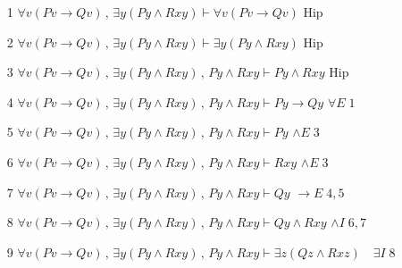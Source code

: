 \documentclass[11pt,letterpaper]{article}
\begin{document}
\begin{enumerate}
\item[1] $ \forall v (Pv \rightarrow Qv) \, , \, \exists y (P y \wedge Rxy) 
\vdash \forall v (Pv \rightarrow Qv) $ \hspace{2cm} Hip
\vspace*{5pt}
\item[2] $ \forall v (Pv \rightarrow Qv) \, , \, \exists y (P y \wedge Rxy) 
\vdash \exists y (P y \wedge Rxy) $ \hspace{2cm} Hip
\vspace*{5pt}
\item[3] $ \forall v (Pv \rightarrow Qv) \, , \, \exists y (P y \wedge Rxy) \, 
, 
\, P y \wedge Rxy \vdash P y \wedge Rxy $ \hspace{0.8cm} Hip
\vspace*{5pt}
\item[4] $ \forall v (Pv \rightarrow Qv) \, , \, \exists y (P y \wedge Rxy) \, 
, 
\, P y \wedge Rxy \vdash P y \rightarrow Qy $ \hspace{0.8cm} $\forall E \; 1$
\vspace*{5pt}
\item[5] $ \forall v (Pv \rightarrow Qv) \, , \, \exists y (P y \wedge Rxy) \, 
, 
\, P y \wedge Rxy \vdash P y  $ \hspace{1.9cm} $\wedge E \; 3$
\vspace*{5pt}
\item[6] $ \forall v (Pv \rightarrow Qv) \, , \, \exists y (P y \wedge Rxy) \, 
, 
\, P y \wedge Rxy \vdash Rxy  $ \hspace{1.7cm} $\wedge E \; 3$
\vspace*{5pt}
\item[7] $ \forall v (Pv \rightarrow Qv) \, , \, \exists y (P y \wedge Rxy) \, 
, 
\, P y \wedge Rxy \vdash Q y  $ \hspace{1.2cm} $\rightarrow E \; 4,5$
\item[8] $ \forall v (Pv \rightarrow Qv) \, , \, \exists y (P y \wedge Rxy) \, 
, 
\, P y \wedge Rxy \vdash Qy \wedge Rxy  $ \hspace{0.5cm} $\wedge I \; 6,7$
\vspace*{5pt}
\item[9] $  \forall v (Pv \rightarrow Qv) \, , \, \exists y (P y \wedge Rxy)\, 
, 
\, P y \wedge Rxy \vdash \exists z ( Qz \wedge Rxz)  \quad \exists I \; 8$
\vspace*{5pt}

\end{enumerate}
\end{document}
